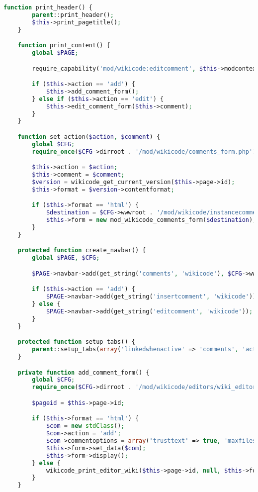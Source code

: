 \begin{lstlisting}[language=PHP]
    function print_header() {
        parent::print_header();
        $this->print_pagetitle();
    }

    function print_content() {
        global $PAGE;

        require_capability('mod/wikicode:editcomment', $this->modcontext, NULL, true, 'noeditcommentpermission', 'wikicode');

        if ($this->action == 'add') {
            $this->add_comment_form();
        } else if ($this->action == 'edit') {
            $this->edit_comment_form($this->comment);
        }
    }

    function set_action($action, $comment) {
        global $CFG;
        require_once($CFG->dirroot . '/mod/wikicode/comments_form.php');

        $this->action = $action;
        $this->comment = $comment;
        $version = wikicode_get_current_version($this->page->id);
        $this->format = $version->contentformat;

        if ($this->format == 'html') {
            $destination = $CFG->wwwroot . '/mod/wikicode/instancecomments.php?pageid=' . $this->page->id;
            $this->form = new mod_wikicode_comments_form($destination);
        }
    }

    protected function create_navbar() {
        global $PAGE, $CFG;

        $PAGE->navbar->add(get_string('comments', 'wikicode'), $CFG->wwwroot . '/mod/wikicode/comments.php?pageid=' . $this->page->id);

        if ($this->action == 'add') {
            $PAGE->navbar->add(get_string('insertcomment', 'wikicode'));
        } else {
            $PAGE->navbar->add(get_string('editcomment', 'wikicode'));
        }
    }

    protected function setup_tabs() {
        parent::setup_tabs(array('linkedwhenactive' => 'comments', 'activetab' => 'comments'));
    }

    private function add_comment_form() {
        global $CFG;
        require_once($CFG->dirroot . '/mod/wikicode/editors/wiki_editor.php');

        $pageid = $this->page->id;

        if ($this->format == 'html') {
            $com = new stdClass();
            $com->action = 'add';
            $com->commentoptions = array('trusttext' => true, 'maxfiles' => 0);
            $this->form->set_data($com);
            $this->form->display();
        } else {
            wikicode_print_editor_wiki($this->page->id, null, $this->format, -1, null, false, null, 'addcomments');
        }
    }


\end{lstlisting}
